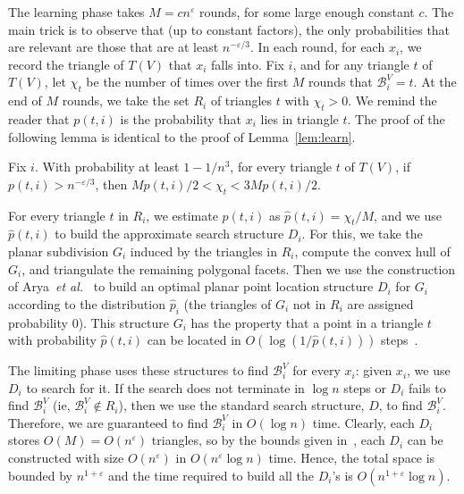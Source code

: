 \documentclass{siamltex}
\newcommand{\eps}{\varepsilon}
\newcommand{\etal}{\emph{et al.}}
\newcommand{\tsearch}{\mathcal{B}}
\begin{document}
The learning phase takes $M = cn^{\eps}$ rounds, for some
large enough constant $c$. 
The main trick is to observe that 
(up to constant factors), the only probabilities that are relevant
are those that are at least $n^{-\eps/3}$. In each round, for each $x_i$,
we record the triangle of $T(V)$ that $x_i$ falls into. Fix $i$, and for any
triangle $t$ of $T(V)$, let $\chi_t$ be the number of times over
the first $M$ rounds that $\tsearch_i^V = t$. 
At the
end of $M$ rounds, we take the set $R_i$ of triangles $t$
with $\chi_t > 0$. 
We remind the reader that $p(t,i)$ is the probability that $x_i$ lies
in triangle $t$. The proof of the following lemma is identical to
the proof of Lemma~\ref{lem:learn}.
\begin{lemma}\label{lem:triangle-chernoff}
Fix $i$. With probability at least $1 - 1/n^3$, for every triangle
$t$ of $T(V)$, if $p(t,i) > n^{-\eps/3}$, then
$Mp(t,i)/2 < \chi_t < 3Mp(t,i)/2$. \qquad \endproof
\end{lemma}

For every triangle $t$  in $R_i$, we estimate $p(t,i)$ as 
$\hat{p}(t,i) = \chi_t/M$,  and we use $\hat{p}(t,i)$ to
build the approximate search structure $D_i$. 
For this, we take the planar subdivision $G_i$ induced by the
triangles in $R_i$, compute the convex hull of $G_i$,
and triangulate the remaining polygonal facets.
Then we use the construction of Arya~\etal~\cite{AMM} 
to build an optimal planar point location structure $D_i$ for $G_i$
according to the distribution $\hat{p}_i$ (the triangles of $G_i$ not
in $R_i$ are assigned probability $0$). This structure $G_i$
has the property that a point in a triangle $t$ with probability $\hat{p}(t,i)$
can be located in $O(\log(1/\hat{p}(t,i)))$ 
steps~\cite[Theorems~1.1 and 1.2]{AMM}. 

The limiting phase
uses these structures to find $\tsearch^V_i$ for every $x_i$: given
$x_i$, we use $D_i$ to search for it. 
If the search does
not terminate in $\log n$ steps or $D_i$ fails to find
$\tsearch_i^V$ (ie,  $\tsearch_i^V \notin R_i$), then we use the
standard search structure, $D$, to find $\tsearch_i^V$. Therefore,
we are guaranteed to find $\tsearch^V_i$ in $O(\log n)$ time.
Clearly, each $D_i$ stores $O(M) = O(n^\eps)$ triangles,
so by the bounds given in~\cite{AMM}, each $D_i$ can be constructed 
with size $O(n^\eps)$ in $O(n^\eps\log n)$ time.
Hence, the total space is bounded by $n^{1+\eps}$ and the
time required to build all the $D_i$'s is $O(n^{1+\eps}\log n)$.
\end{document}
